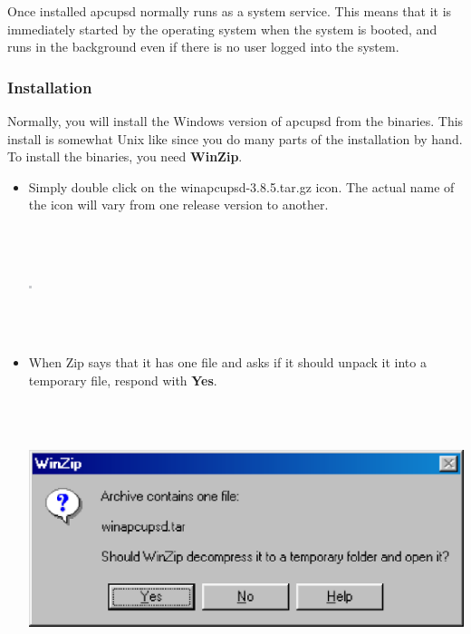 {{{{{{{{{{Once installed apcupsd normally runs as a system service.  This means that it
is immediately started by the operating system when the system is booted, and
runs in the background even if there is no user logged into the system. 

\label{Installation}

\subsubsection*{Installation}

Normally, you will install the Windows version of apcupsd from the binaries.
This install is somewhat Unix like since you do many parts of the installation
by hand. To install the binaries, you need {\bf WinZip}.  

\begin{itemize}
\item Simply double click on the winapcupsd-3.8.5.tar.gz icon.  The actual
name of the icon will vary from one release version to another.  

\footnotesize
\begin{verbatim}
     
     
\end{verbatim}
\normalsize

\includegraphics{./wininstall3.eps}  

\footnotesize
\begin{verbatim}
     
     
\end{verbatim}
\normalsize

\item When Zip says that it has one file and asks if it should unpack it into
a temporary file, respond with {\bf Yes}.  

\footnotesize
\begin{verbatim}
     
     
\end{verbatim}
\normalsize

\includegraphics{./wininstall4.eps}  


\end{itemize}}}}}}}}}}}
